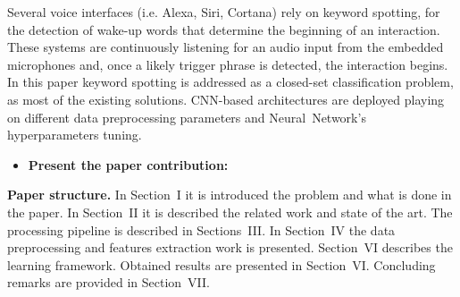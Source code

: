 \noindent  Several voice interfaces (i.e. Alexa, Siri, Cortana) rely on keyword spotting, for the detection of wake-up words that determine the beginning of an interaction. These systems are continuously listening for an audio input from the embedded microphones and, once a likely trigger phrase is detected, the interaction begins. 
In this paper keyword spotting is addressed as a closed-set classification problem, as most of the existing solutions. CNN-based architectures are deployed playing on different data preprocessing parameters and \mbox{Neural Network's} hyperparameters tuning. 
\begin{itemize} 
\item \textbf{Present the paper contribution:} 
\end{itemize}
\noindent \textbf{Paper structure.} In Section~I it is introduced the problem and what is done in the paper. In Section~II it is described the related work and state of the art. The processing pipeline is described in Sections~III. In Section~IV the data preprocessing and features extraction work is presented. Section~VI describes the learning framework. Obtained results are presented in Section~VI.  Concluding remarks are provided in Section~VII.

